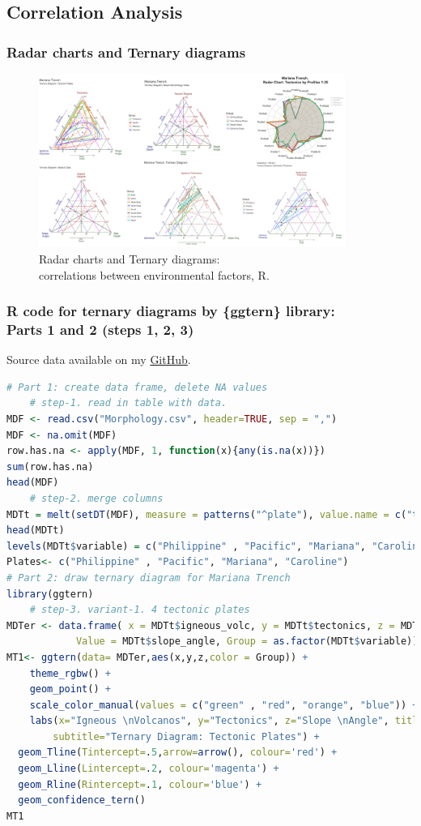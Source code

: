 \documentclass[pdflatex,compress,10pt,
	xcolor={dvipsnames,dvipsnames,svgnames,x11names,table},
	hyperref={colorlinks = true,breaklinks = true, urlcolor = NavyBlue, breaklinks = true}]{beamer}
\begin{document}
\subsection{Correlation Analysis}

\begin{frame}\frametitle{Radar charts and Ternary diagrams}
\begin{figure}[H]
	\centering
		\includegraphics[width=10cm]{Fig-3-5.jpg}\caption{Radar charts and Ternary diagrams: \\correlations between environmental factors, R.}
\end{figure}		
\end{frame}

\begin{frame}[fragile,shrink=10]\frametitle{R code for ternary diagrams by \{ggtern\} library: \\Parts 1 and 2 (steps 1, 2, 3)}
Source data available on my \href{https://github.com/paulinelemenkova/29-R-Ternary}{GitHub}.
\begin{lstlisting}[language=R]
# Part 1: create data frame, delete NA values
	# step-1. read in table with data.
MDF <- read.csv("Morphology.csv", header=TRUE, sep = ",")
MDF <- na.omit(MDF) 
row.has.na <- apply(MDF, 1, function(x){any(is.na(x))})
sum(row.has.na) 
head(MDF) 
	# step-2. merge columns
MDTt = melt(setDT(MDF), measure = patterns("^plate"), value.name = c("tectonics"))
head(MDTt)
levels(MDTt$variable) = c("Philippine" , "Pacific", "Mariana", "Caroline")
Plates<- c("Philippine" , "Pacific", "Mariana", "Caroline")
# Part 2: draw ternary diagram for Mariana Trench
library(ggtern)  
 	# step-3. variant-1. 4 tectonic plates
MDTer <- data.frame( x = MDTt$igneous_volc, y = MDTt$tectonics, z = MDTt$slope_angle,
			Value = MDTt$slope_angle, Group = as.factor(MDTt$variable))
MT1<- ggtern(data= MDTer,aes(x,y,z,color = Group)) + 
	theme_rgbw() +
	geom_point() + 
	scale_color_manual(values = c("green" , "red", "orange", "blue")) + 
	labs(x="Igneous \nVolcanos", y="Tectonics", z="Slope \nAngle", title="Mariana Trench",
  		subtitle="Ternary Diagram: Tectonic Plates") +
  geom_Tline(Tintercept=.5,arrow=arrow(), colour='red') +
  geom_Lline(Lintercept=.2, colour='magenta') +
  geom_Rline(Rintercept=.1, colour='blue') +
  geom_confidence_tern() 
MT1
\end{lstlisting}
\end{frame}
\end{document}
